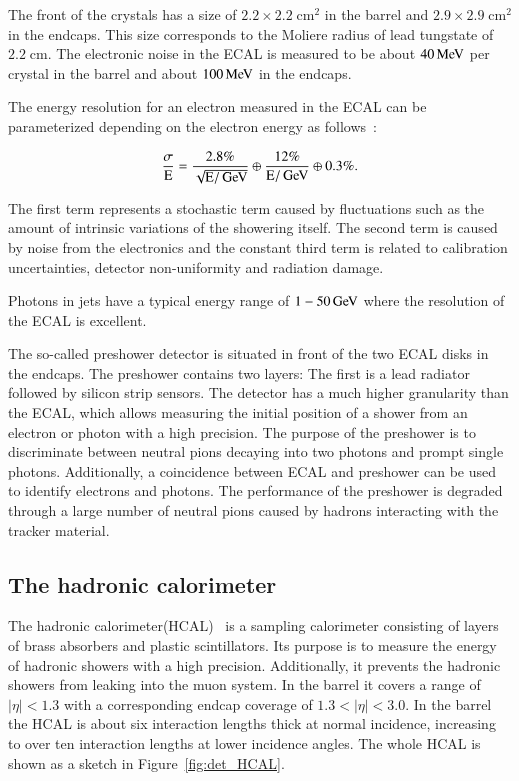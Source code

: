 The front of the crystals has a size of $2.2 \times 2.2 \;\si{\centi \meter \squared}$ in the barrel and $2.9 \times 2.9 \;\si{\centi \meter \squared}$ in the endcaps. This size corresponds to the Moliere radius of lead tungstate of $2.2 \;\si{\centi \meter}$.
The electronic noise in the ECAL is measured to be about $40 \,\text{Me\hspace{-.08em}V}$ per crystal in the barrel and about $100 \,\text{Me\hspace{-.08em}V}$ in the endcaps.

The energy resolution for an electron measured in the ECAL can be parameterized depending on the electron energy as follows~\cite{Sirunyan:2017ulk}:

\begin{equation}
\frac{\sigma}{\mathrm{E}} = \frac{2.8\%}{\sqrt{\mathrm{E}/\,\text{Ge\hspace{-.08em}V}}} \oplus \frac{12\%}{\mathrm{E} / \,\text{Ge\hspace{-.08em}V}} \oplus 0.3\%.
\end{equation}

The first term represents a stochastic term caused by fluctuations such as the amount of intrinsic variations of the showering itself. The second term is caused by noise from the electronics and the constant third term is related
to calibration uncertainties, detector non-uniformity and radiation damage.

Photons in jets have a typical energy range of $1-50 \,\text{Ge\hspace{-.08em}V}$ where the resolution of the ECAL is excellent.

The so-called preshower detector is situated in front of the two ECAL disks in the endcaps.
The preshower contains two layers: The first is a lead radiator followed by silicon strip sensors.
The detector has a much higher granularity than the ECAL, which allows measuring the initial position of a shower from an electron or photon with a high precision.
The purpose of the preshower is to discriminate  between neutral pions decaying into two photons and prompt single photons.
Additionally, a coincidence between ECAL and preshower can be used to identify electrons and photons.
The performance of the preshower is degraded through a large number of neutral pions caused by hadrons interacting with the tracker material.

\subsection{The hadronic calorimeter}

The hadronic calorimeter(HCAL)~\cite{Bayatian:922757} is a sampling calorimeter consisting of layers of brass absorbers and plastic scintillators.
Its purpose is to measure the energy of hadronic showers with a high precision. Additionally, it prevents the hadronic showers from leaking into the muon system.
In the barrel it covers a range of $|\eta|< 1.3$ with a corresponding endcap coverage of $1.3 <|\eta|< 3.0$.
In the barrel the HCAL is about six interaction lengths thick at normal incidence, increasing to over ten interaction lengths at lower incidence angles.
The whole HCAL is shown as a sketch in Figure~\ref{fig:det_HCAL}.



